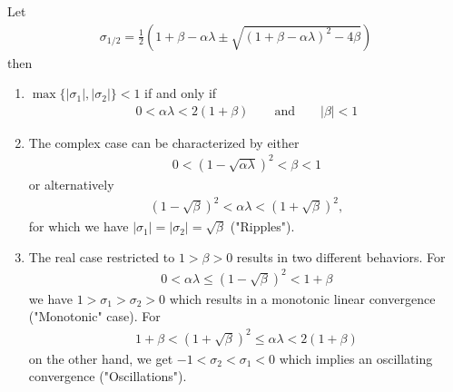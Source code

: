 \begin{theorem}
	\label{thm: momentum - stable set of parameters}
	Let
	\begin{align*}
		\sigma_{1/2}
		= \tfrac12 \left(
			1+\beta-\alpha\lambda \pm \sqrt{(1+\beta-\alpha\lambda)^2 - 4\beta}
		\right)
	\end{align*}
	then 
	\begin{enumerate}
		\item \(\max\{|\sigma_1|,|\sigma_2|\}<1\) if and only if
		\begin{align*}
			0<\alpha\lambda < 2(1+\beta) \qquad \text{and} \qquad |\beta|<1
		\end{align*}
		\item The complex case can be characterized by either
		\begin{align*}
			0<(1-\sqrt{\alpha\lambda})^2 < \beta < 1
		\end{align*}		
		or alternatively
		\begin{align*}
			(1-\sqrt{\beta})^2 < \alpha\lambda < (1+\sqrt{\beta})^2,
		\end{align*}
		for which we have \(|\sigma_1|=|\sigma_2|=\sqrt{\beta}\) ("Ripples").
		\item The real case restricted to \(1>\beta>0\) results in two different	
		behaviors. For
		\begin{align*}
			0<\alpha\lambda \le (1-\sqrt{\beta})^2 < 1+\beta
		\end{align*}
		we have \(1>\sigma_1 > \sigma_2 > 0\) which results in a monotonic
		linear convergence ("Monotonic" case). For
		\begin{align*}
			1+\beta < (1+\sqrt{\beta})^2\le \alpha\lambda < 2(1+\beta)
		\end{align*}
		on the other hand, we get \(-1 < \sigma_2 < \sigma_1 < 0\) which implies 
		an oscillating convergence ("Oscillations").
	\end{enumerate}
\end{theorem}
